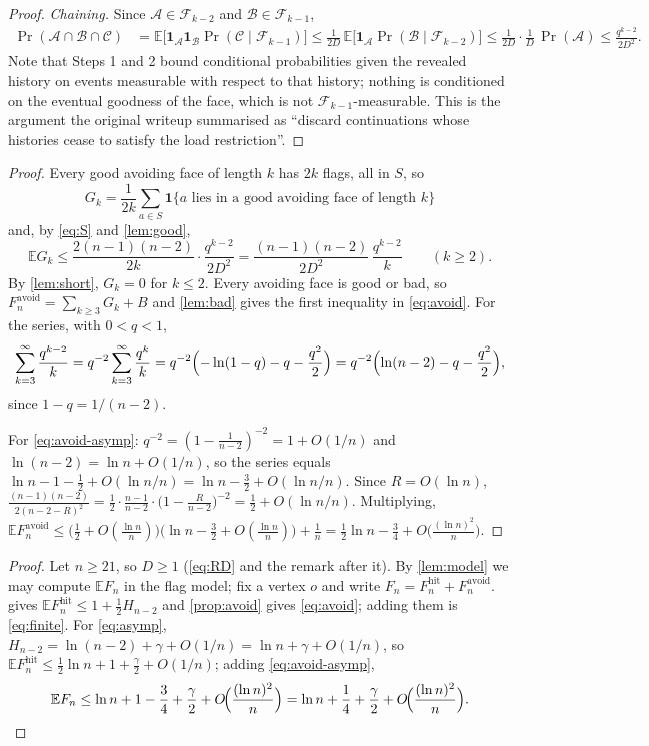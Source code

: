 \documentclass[11pt,a4paper]{article}
\theoremstyle{plain}
\theoremstyle{definition}
\theoremstyle{remark}
\newcommand{\E}{\mathbb E}
\newcommand{\cF}{\mathcal F}
\newcommand{\Fhit}{F_n^{\mathrm{hit}}}
\newcommand{\Favoid}{F_n^{\mathrm{avoid}}}
\newcommand{\Ind}{\mathbf 1}
\begin{document}
\begin{proof}
\emph{Chaining.} Since $\mathcal A\in\cF_{k-2}$ and $\mathcal B\in\cF_{k-1}$,
\begin{align*}
\Pr(\mathcal A\cap\mathcal B\cap\mathcal C)
&=\E\bigl[\Ind_{\mathcal A}\Ind_{\mathcal B}\Pr(\mathcal C\mid\cF_{k-1})\bigr]
\le\frac1{2D}\,\E\bigl[\Ind_{\mathcal A}\Pr(\mathcal B\mid\cF_{k-2})\bigr]
\le\frac1{2D}\cdot\frac1D\,\Pr(\mathcal A)\le\frac{q^{k-2}}{2D^2}.
\end{align*}
Note that Steps 1 and 2 bound conditional probabilities given the revealed history on events measurable with respect to that history; nothing is conditioned on the eventual goodness of the face, which is not $\cF_{k-1}$-measurable. This is the argument the original writeup summarised as ``discard continuations whose histories cease to satisfy the load restriction''.
\end{proof}

\label{pf:avoid}
\propavoid*
\begin{proof}
Every good avoiding face of length $k$ has $2k$ flags, all in $S$, so
\[
G_k=\frac1{2k}\sum_{a\in S}\Ind\{a\text{ lies in a good avoiding face of length }k\}
\]
and, by \eqref{eq:S} and \cref{lem:good},
\[
\E G_k\le\frac{2(n-1)(n-2)}{2k}\cdot\frac{q^{k-2}}{2D^2}=\frac{(n-1)(n-2)}{2D^2}\,\frac{q^{k-2}}k\qquad(k\ge2).
\]
By \cref{lem:short}, $G_k=0$ for $k\le2$. Every avoiding face is good or bad, so $\Favoid=\sum_{k\ge3}G_k+B$ and \cref{lem:bad} gives the first inequality in \eqref{eq:avoid}. For the series, with $0<q<1$,
\[
\sum_{k=3}^\infty\frac{q^{k-2}}k=q^{-2}\sum_{k=3}^\infty\frac{q^k}k=q^{-2}\Bigl(-\ln(1-q)-q-\frac{q^2}2\Bigr)=q^{-2}\Bigl(\ln(n-2)-q-\frac{q^2}2\Bigr),
\]
since $1-q=1/(n-2)$.

For \eqref{eq:avoid-asymp}: $q^{-2}=(1-\frac1{n-2})^{-2}=1+O(1/n)$ and $\ln(n-2)=\ln n+O(1/n)$, so the series equals $\ln n-1-\frac12+O(\ln n/n)=\ln n-\frac32+O(\ln n/n)$. Since $R=O(\ln n)$, $\frac{(n-1)(n-2)}{2(n-2-R)^2}=\frac12\cdot\frac{n-1}{n-2}\cdot\bigl(1-\frac R{n-2}\bigr)^{-2}=\frac12+O(\ln n/n)$. Multiplying, $\E\Favoid\le\bigl(\frac12+O(\frac{\ln n}n)\bigr)\bigl(\ln n-\frac32+O(\frac{\ln n}n)\bigr)+\frac1n=\frac12\ln n-\frac34+O\bigl(\frac{(\ln n)^2}n\bigr)$.
\end{proof}

\label{pf:main}
\thmmain*
\begin{proof}
Let $n\ge21$, so $D\ge1$ (\cref{eq:RD} and the remark after it). By \cref{lem:model} we may compute $\E F_n$ in the flag model; fix a vertex $o$ and write $F_n=\Fhit+\Favoid$.  gives $\E\Fhit\le1+\frac12H_{n-2}$ and \cref{prop:avoid} gives \eqref{eq:avoid}; adding them is \eqref{eq:finite}. For \eqref{eq:asymp}, $H_{n-2}=\ln(n-2)+\gamma+O(1/n)=\ln n+\gamma+O(1/n)$, so $\E\Fhit\le\frac12\ln n+1+\frac\gamma2+O(1/n)$; adding \eqref{eq:avoid-asymp},
\[
\E F_n\le\ln n+1-\frac34+\frac\gamma2+O\!\Bigl(\frac{(\ln n)^2}n\Bigr)=\ln n+\frac14+\frac\gamma2+O\!\Bigl(\frac{(\ln n)^2}n\Bigr).\qedhere
\]
\end{proof}
\end{document}
